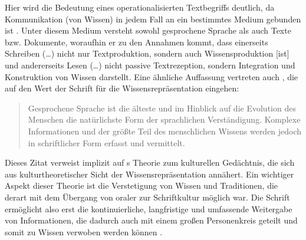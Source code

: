 Hier wird die Bedeutung eines operationalisierten Textbegriffs deutlich, da \glqq Kommunikation (von Wissen) in jedem Fall an ein bestimmtes Medium gebunden ist\grqq{} \citep[15]{brauer_hypertext_1990}. Unter diesem Medium versteht \citeauthor{brauer_hypertext_1990} sowohl gesprochene Sprache als auch Texte bzw. Dokumente, woraufhin er zu den Annahmen kommt, dass einerseits \glqq Schreiben (\dots) nicht nur Textproduktion, sondern auch Wissensproduktion [ist]\grqq{} \citep[15]{brauer_hypertext_1990} und andererseits \glqq Lesen (\dots) nicht passive Textrezeption, sondern Integration und Konstruktion von Wissen\grqq{} \citep[15]{brauer_hypertext_1990} \label{K2:quote:brauer-wissensproduktion} darstellt. Eine ähnliche Auffassung vertreten auch \citeauthor{burchardt_deutsche_2012}, die auf den Wert der Schrift für die Wissensrepräsentation eingehen:

\begin{quote}
Gesprochene Sprache ist die älteste und im Hinblick auf die Evolution des Menschen die natürlichste Form der sprachlichen Verständigung. Komplexe Informationen und der größte Teil des menschlichen Wissens werden jedoch in schriftlicher Form erfasst und vermittelt. \citep[17]{burchardt_deutsche_2012}
\end{quote}

Dieses Zitat verweist implizit auf \citeauthor{assmann_kulturelle_2002}s Theorie zum kulturellen Gedächtnis, die sich aus kulturtheoretischer Sicht der Wissensrepräsentation annähert. Ein wichtiger Aspekt dieser Theorie ist die Verstetigung von Wissen und Traditionen, die derart mit dem Übergang von oraler zur Schriftkultur möglich war. Die Schrift ermöglicht also erst die kontinuierliche, langfristige und umfassende Weitergabe von Informationen, die dadurch auch mit einem großen Personenkreis geteilt und somit zu Wissen verwoben werden können \citep[]{assmann_kulturelle_2002}.

